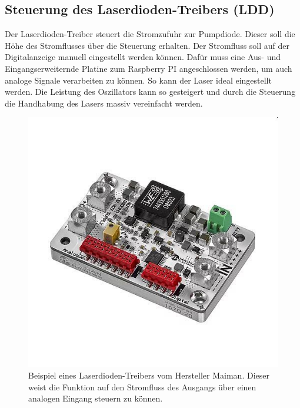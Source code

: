 \subsection{Steuerung des Laserdioden-Treibers (LDD)}
Der Laserdioden-Treiber steuert die Stromzufuhr zur Pumpdiode. Dieser soll die Höhe des Stromflusses über die Steuerung erhalten. Der Stromfluss soll auf der Digitalanzeige manuell eingestellt werden können. Dafür muss eine Aus- und Eingangserweiternde Platine zum Raspberry PI angeschlossen werden, um auch analoge Signale verarbeiten zu können.
So kann der Laser ideal eingestellt werden. Die Leistung des Oszillators kann so gesteigert und durch die Steuerung die Handhabung des Lasers massiv vereinfacht werden.

\begin{figure}[H]
    \centering
    \includegraphics[scale=0.5, trim={0 30mm 0 40mm},clip]{98_images/SF6015.jpg}
    \caption{Beispiel eines Laserdioden-Treibers vom Hersteller Maiman. Dieser weist die Funktion auf den Stromfluss des Ausgangs über einen analogen Eingang steuern zu können.}
    \label{fig:ldd}
\end{figure}


